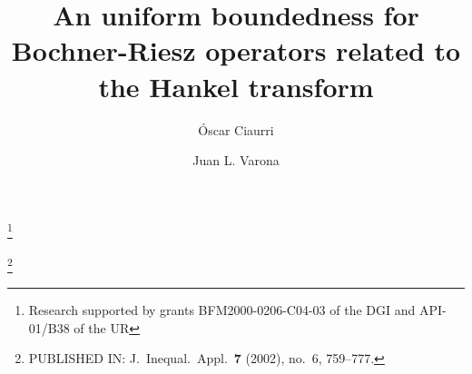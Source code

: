 \documentclass{amsart}
\theoremstyle{remark}
\begin{document}
\title[Bochner-Riesz operators]{An uniform boundedness
for Bochner-Riesz operators related to the Hankel transform}

\thanks{Research supported by grants
BFM2000-0206-C04-03 of the DGI and API-01/B38 of the UR}

\author[\'O. Ciaurri]{\'Oscar Ciaurri}
\address{Departamento de Matem\'aticas y Computaci\'on,
Universidad de La Rioja, Edificio J.~L.~Vives,
Calle Luis de Ulloa s/n, 26004 Logro\~no, Spain}

\author[J. L. Varona]{Juan L. Varona}
\address{Departamento de Matem\'aticas y Computaci\'on,
Universidad de La Rioja, Edificio J.~L.~Vives,
Calle Luis de Ulloa s/n, 26004 Logro\~no, Spain}



\thanks{PUBLISHED IN: J.\ Inequal.\ Appl.\ \textbf{7} (2002), no.~6, 759--777.}

\end{document}
